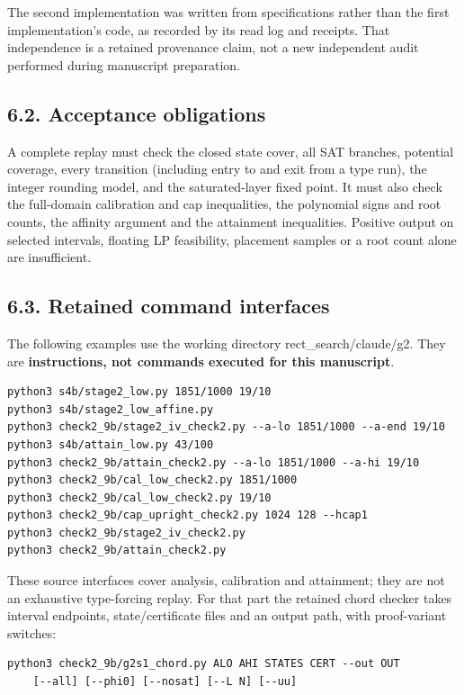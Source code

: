 \documentclass[
  11pt,
  a4paper,
]{article}
\begin{document}
The second implementation was written from specifications rather than
the first implementation's code, as recorded by its read log and
receipts. That independence is a retained provenance claim, not a new
independent audit performed during manuscript preparation.

\subsection{6.2. Acceptance obligations}\label{acceptance-obligations}

A complete replay must check the closed state cover, all SAT branches,
potential coverage, every transition (including entry to and exit from a
type run), the integer rounding model, and the saturated-layer fixed
point. It must also check the full-domain calibration and cap
inequalities, the polynomial signs and root counts, the affinity
argument and the attainment inequalities. Positive output on selected
intervals, floating LP feasibility, placement samples or a root count
alone are insufficient.

\subsection{6.3. Retained command
interfaces}\label{retained-command-interfaces}

The following examples use the working directory rect\_search/claude/g2.
They are \textbf{instructions, not commands executed for this
manuscript}.

\begin{verbatim}
python3 s4b/stage2_low.py 1851/1000 19/10
python3 s4b/stage2_low_affine.py
python3 check2_9b/stage2_iv_check2.py --a-lo 1851/1000 --a-end 19/10
python3 s4b/attain_low.py 43/100
python3 check2_9b/attain_check2.py --a-lo 1851/1000 --a-hi 19/10
python3 check2_9b/cal_low_check2.py 1851/1000
python3 check2_9b/cal_low_check2.py 19/10
python3 check2_9b/cap_upright_check2.py 1024 128 --hcap1
python3 check2_9b/stage2_iv_check2.py
python3 check2_9b/attain_check2.py
\end{verbatim}

These source interfaces cover analysis, calibration and attainment; they
are not an exhaustive type-forcing replay. For that part the retained
chord checker takes interval endpoints, state/certificate files and an
output path, with proof-variant switches:

\begin{verbatim}
python3 check2_9b/g2s1_chord.py ALO AHI STATES CERT --out OUT
    [--all] [--phi0] [--nosat] [--L N] [--uu]
\end{verbatim}
\end{document}
